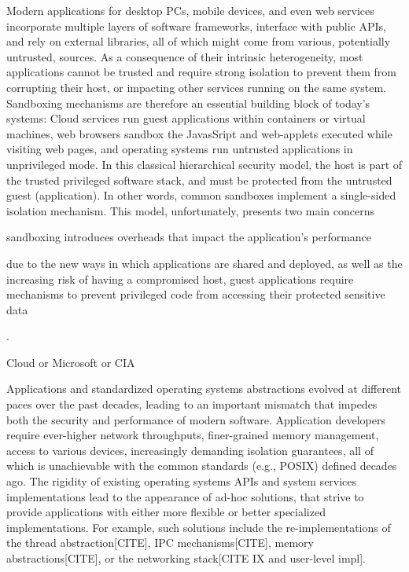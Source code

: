 Modern applications for desktop PCs, mobile devices, and even web services incorporate multiple layers of software frameworks, interface with public APIs, and rely on external libraries, all of which might come from various, potentially untrusted, sources.
As a consequence of their intrinsic heterogeneity, most applications cannot be trusted and require strong isolation to prevent them from corrupting their host, or impacting other services running on the same system.
Sandboxing mechanisms are therefore an essential building block of today's systems: Cloud services run guest applications within containers or virtual machines, web browsers sandbox the JavasSript and web-applets executed while visiting web pages, and operating systems run untrusted applications in unprivileged mode.
In this classical hierarchical security model, the host is part of the trusted privileged software stack, and must be protected from the untrusted guest (application).
In other words, common sandboxes implement a single-sided isolation mechanism.
This model, unfortunately, presents two main concerns 
\begin{enumerate*}
	\item sandboxing introduces overheads that impact the application's performance
	\item due to the new ways in which applications are shared and deployed, as well as the increasing risk of having a compromised host, guest applications require mechanisms to prevent privileged code from accessing their protected sensitive data
\end{enumerate*}.


Cloud or Microsoft or CIA



Applications and standardized operating systems abstractions evolved at different paces over the past decades, leading to an important mismatch that impedes both the security and performance of modern software.
Application developers require ever-higher network throughputs, finer-grained memory management, access to various devices, increasingly demanding isolation guarantees, all of which is unachievable with the common standards (e.g., POSIX) defined decades ago.
The rigidity of existing operating systems APIs and system services implementations lead to the appearance of ad-hoc solutions, that strive to provide applications with either more flexible or better specialized implementations.
For example, such solutions include the re-implementations of the thread abstraction[CITE], IPC mechanisms[CITE], memory abstractions[CITE], or the networking stack[CITE IX and user-level impl].

